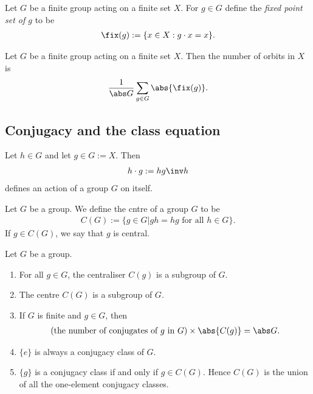 \documentclass{article}
\begin{document}
\begin{definition}
    Let $G$ be a finite group acting on a finite set $X$. For $g\in G$
    define the \emph{fixed point set of $g$} to be
    \begin{align*}
        \fix(g) := \{x\in X : g\cdot x = x\}.
    \end{align*} 
\end{definition}

\begin{theorem}
    Let $G$ be a finite group acting on a finite set $X$. Then
    the number of orbits in $X$ is
    \begin{align*}
        \frac{1}{\abs G} \sum_{g\in G} \abs{\fix(g)}.
    \end{align*}
\end{theorem}

\subsection{Conjugacy and the class equation}

\begin{lemma}
    Let $h\in G$ and let $g\in G := X$. Then
    \begin{align*}
        h\cdot g := hg\inv h
    \end{align*}
    defines an action of a group $G$ on itself.
\end{lemma}

\setcounter{theorem}{3}
\begin{definition}
    Let $G$ be a group. We define the cntre of a group $G$ to be
    \begin{align*}
        C(G) := \{g\in G | gh = hg \text{ for all } h\in G\}.
    \end{align*}
    If $g\in C(G)$, we say that $g$ is central.
\end{definition}

\setcounter{theorem}{5}
\begin{corollary}
    Let $G$ be a group.
    \begin{enumerate}
        \item For all $g\in G$, the centraliser $C(g)$ is a subgroup of $G$.
        \item The centre $C(G)$ is a subgroup of $G$.
        \item If $G$ is finite and $g\in G$, then \begin{align*}
            (\text{the number of conjugates of $g$ in $G$})\times
            \abs{C(g)} = \abs G.
        \end{align*}
        \item $\{e\}$ is always a conjugacy class of $G$.
        \item $\{g\}$ is a conjugacy class if and only if $g\in C(G)$. Hence
        $C(G)$ is the union of all the one-element conjugacy classes.
    \end{enumerate}
\end{corollary}
\end{document}
